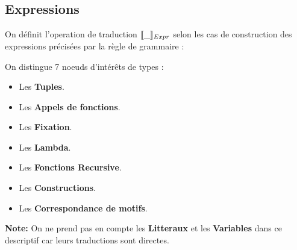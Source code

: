 \documentclass[
  12pt,
]{article}
\providecommand{\tightlist}{%
  \setlength{\itemsep}{0pt}\setlength{\parskip}{0pt}}
\begin{document}
\subsection{Expressions}\label{exprs}

On définit l'operation de traduction \(\llbracket \_ \rrbracket_{Expr}\) selon les cas de construction
des expressions précisées par la règle de grammaire : 

On distingue 7 noeuds d'intérêts de types :
\begin{itemize}
  \tightlist
  \item
        Les \textbf{Tuples}.
  \item
        Les \textbf{Appels de fonctions}.
  \item
        Les \textbf{Fixation}.
  \item
        Les \textbf{Lambda}.
  \item
        Les \textbf{Fonctions Recursive}.
  \item
        Les \textbf{Constructions}.
  \item
        Les \textbf{Correspondance de motifs}.
\end{itemize}
\textbf{Note:} On ne prend pas en compte les \textbf{Litteraux} et les \textbf{Variables} dans ce descriptif car leurs traductions sont directes.
\end{document}
